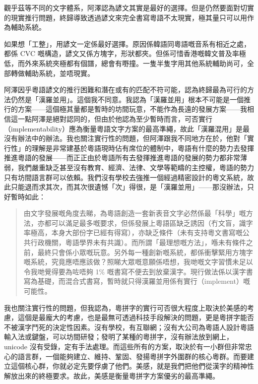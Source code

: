 \documentclass[a5paper, 12pt, openany]{book} %
\begin{document}
觀乎茲等不同的文字體系，阿澤認為諺文其實是最好的選擇。但是仍然要面對切實的現實推行問題，終歸導致透過諺文來完全書寫粵語不太現實，極其量只可以用作為輔助系統。

如果想「工整」，用諺文一定係最好選擇。原因係韓語同粵語嘅音系有相近之處，都係 CVC 嘅構造，諺文又係方塊字，形狀都夾。但係可惜香港嘅韓文普及率極低，而外來系統夾極都有個譜，總會有嘢撞。一隻半隻字用其他系統輔助尚可，全部轉做輔助系統，並唔現實。

阿澤因乎粵語諺文的推行困難和潛在或有的匹配不符可能，認為終歸最為可行的方法仍然是「漢羅並用」。這個我不同意。我認為「漢羅並用」根本不可能是一個推行的方案——這個極其量都是暫時的坊間玩意，不能作為長遠的發展方案——我相信這一點阿澤是絕對認同的，但由於他認為至少暫時而言，可否實行（implementability）應為衡量粵語文字方案的最高準繩，故此「漢羅混用」是最沒有辦法中的辦法。我也關注實行性的問題，但阿澤跟我不同地方在於，他對「實行性」的理解是非常建基於粵語現時佔有席位的體制中，粵語有什麼的勢力去發揮推進粵語的發展——而正正由於粵語所有去發揮推進粵語的發展的勢力都非常薄弱，我們嚴重缺乏甚至沒有教育、經濟、法律、文學等範疇的主控權，粵語的勢力只有坊間語言群可以依賴。我們沒有學校去強推一個經過精密設計的粵文系統，故此只能退而求其次，而其次很遺憾「次」得很，是「漢羅並用」——那沒辦法，只好暫時如此：


\begin{quotation}
由文字發展嘅角度去睇，為粵語創造一套新表音文字必然係最「科學」嘅方法，亦都可以滿足最多嘅要求，但係發展上粵語區缺乏誘因（冇文盲，識字率極高，本身大部份字已經有得寫），亦缺乏條件（未有支持粵文書寫嘅公共行政機關，粵語學界未有共識）。而所謂「最理想嘅方法」，喺未有條件之前，最終只會係小眾嘅玩意。另外每一種創新嘅系統，都係衝擊緊用方塊字嘅系統，究竟應唔應該做？照睇大眾嘅意願係唔想，我哋嘅文字習慣未足以令我哋覺得要為咗唔夠 1\% 嘅書寫不便去到放棄漢字。現行做法係以漢字書寫為基礎，而混合式書寫，暫時就只得漢羅並用係有實行（implement）嘅可能性。

\end{quotation}

我也關注實行性的問題，但我認為，粵拼字的實行可否很大程度上取決於美感的考慮，這個是最龐大的考慮，也是最無可透過科技手段解決的問題，更是粵拼字能否不被漢字鬥死的決定性因素。沒有學校，有互聯網；沒有大公司為粵語人設計粵語輸入法或鍵盤，可以坊間研發；發明了某種的粵拼字，沒有辦法放到網上，unicode 沒有受錄，定有手法處理。而這些所有的方案，取決於有一小群但非常忠心的語言群，一個能夠建立、維持、鞏固、發揚粵拼字外圍群的核心粵群。而要建立這個核心群，你就必定先要俘虜了他們。美感，就是我們把他們從漢字的精神性解放出來的終極要求。故此，美感是衡量粵拼字方案優劣的最高準繩。
\end{document}
